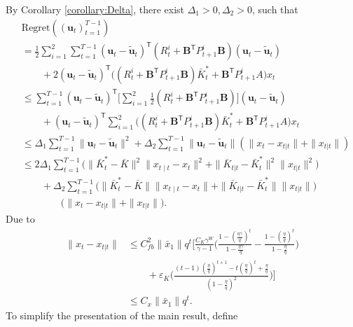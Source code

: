 \documentclass[letterpaper, 10 pt, conference]{ieeeconf}  %
\newcommand{\contTilde}[1]{\mathbf{\tilde{#1}}}
\newcommand{\transpose}{\mathsf{T}}
\begin{document}
By Corollary \ref{corollary:Delta}, there exist $\Delta_{1}>0,\Delta_{2}>0$, such that
\begin{align*}
    &\text{Regret}((\mathbf{u}_{t})_{t=1}^{T-1})\\
    &= \frac{1}{2}\sum_{i=1}^{2}\sum_{t=1}^{T-1} (\mathbf{u}_{t}-\contTilde{u}_{t})^{\transpose}(R_{t}^{i}+\mathbf{B}^{\transpose}P_{t+1}^{i}\mathbf{B})(\mathbf{u}_{t}-\contTilde{u}_{t})\\
    &\qquad + 2(\mathbf{u}_{t}-\contTilde{u}_{t})^{\transpose}\bigg((R_{t}^{i}+\mathbf{B}^{\transpose}P_{t+1}^{i}\mathbf{B})\bar{K}_{t}^{*}+\mathbf{B}^{\transpose}P_{t+1}^{i}A\bigg)x_{t}\\
    &\leq \sum_{t=1}^{T-1} (\mathbf{u}_{t}-\contTilde{u}_{t})^{\transpose}\bigg[\sum_{i=1}^{2}\frac{1}{2}(R_{t}^{i}+\mathbf{B}^{\transpose}P_{t+1}^{i}\mathbf{B})\bigg](\mathbf{u}_{t}-\contTilde{u}_{t})\\
    &\qquad + (\mathbf{u}_{t}-\contTilde{u}_{t})^{\transpose}\sum_{i=1}^{2}\bigg( (R_{t}^{i}+\mathbf{B}^{\transpose}P_{t+1}^{i}\mathbf{B})\bar{K}_{t}^{*}+\mathbf{B}^{\transpose}P_{t+1}^{i}A\bigg)x_{t}\\
    &\leq \Delta_{1} \sum_{t=1}^{T-1} \|\mathbf{u}_{t}-\contTilde{u}_{t}\|^2 + \Delta_{2}\sum_{t=1}^{T-1} \|\mathbf{u}_{t}-\contTilde{u}_{t}\|(\|x_{t}-x_{t|t}\| + \|x_{t|t}\|)\\
    &\leq 2\Delta_{1} \sum_{t=1}^{T-1} \bigg(\|\bar{K}_{t}^{*}-\bar{K}\|^{2}\|x_{t\mid t}-x_{t}\|^{2}  + \|\bar{K}_{t|t}-\bar{K}_{t}^{*}\|^{2} \|x_{t|t}\|^{2} \bigg)\\
    &\qquad + \Delta_{2}\sum_{t=1}^{T-1}\bigg( \|\bar{K}_{t}^{*}-\bar{K}\|\|x_{t\mid t}-x_{t}\|  + \|\bar{K}_{t|t}-\bar{K}_{t}^{*}\| \|x_{t|t}\|\bigg)\\
    &\qquad\qquad\bigg(\|x_{t}-x_{t|t}\| + \|x_{t|t}\|\bigg).
\end{align*}
Due to
\begin{align*}
    \|x_{t}-x_{t|t}\|&\leq C_{fb}^{2}\|\bar{x}_{1}\|q^{t}[\frac{C_{K}\gamma^{W}}{\gamma-1}\bigg(\frac{1-(\frac{\eta\gamma}{q})^{t}}{1-\frac{\eta\gamma}{q}} - \frac{1-(\frac{\eta}{q})^{t}}{1-\frac{\eta}{q}} \bigg)\\
    &\qquad+\varepsilon_{K}\bigg(\frac{(t-1)(\frac{\eta}{q})^{t+1}-t(\frac{\eta}{q})^{t}+\frac{\eta}{q}}{(1-\frac{\eta}{q})^{2}}\bigg)]\\
    &\leq C_{x}\|\bar{x}_{1}\|q^{t}.
\end{align*}
To simplify the presentation of the main result, define
\end{document}
